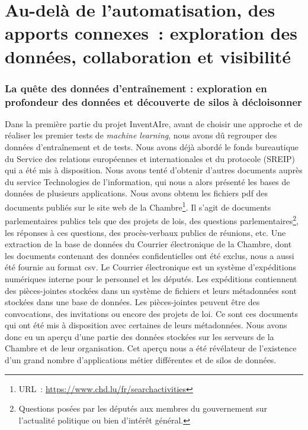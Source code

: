 \chapter{Au-delà de l'automatisation, des apports connexes~: exploration des données, collaboration et visibilité}

\subsection{La quête des données d'entraînement : exploration en profondeur des données et découverte de silos à décloisonner}


	Dans la première partie du projet InventAIre, avant de choisir une
approche et de réaliser les premier tests de \emph{machine learning},
nous avons dû regrouper des données d'entraînement et de tests. Nous
avons déjà abordé le fonds bureautique du Service des relations
européennes et internationales et du protocole (SREIP) qui a été mis à
disposition. Nous avons tenté d'obtenir d'autres documents auprès du
service Technologies de l'information, qui nous a alors présenté les bases
de données de plusieurs applications. Nous avons obtenu les fichiers pdf
des documents publiés sur le site web de la Chambre\footnote{URL~: \url{https://www.chd.lu/fr/searchactivities}}.
Il s'agit de documents parlementaires publics tels que des projets de
lois, des questions parlementaires\footnote{Questions posées par les députés aux membres du gouvernement sur l'actualité politique ou bien d'intérêt général.}, les réponses à ces
questions, des procès-verbaux publics de réunions, etc. Une extraction
de la base de données du Courrier électronique de la Chambre, dont les
documents contenant des données confidentielles ont été exclus, nous a
aussi été fournie au format csv. Le Courrier électronique est un système
d'expéditions numériques interne pour le personnel et les députés. Les
expéditions contiennent des pièces-jointes stockées dans un système de fichiers et leurs métadonnées sont stockées dans une base de
données. Les pièces-jointes peuvent être des convocations, des invitations ou encore des
projets de loi. Ce sont ces documents qui ont été mis à disposition
avec certaines de leurs métadonnées. Nous avons donc eu un aperçu d'une
partie des données stockées sur les serveurs de la Chambre et de leur
organisation. Cet aperçu nous a été révélateur de l'existence d'un grand
nombre d'applications métier différentes et de silos de données.

